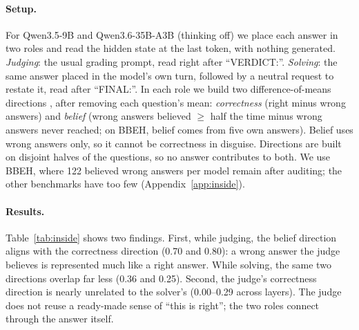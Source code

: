 \documentclass[11pt]{article}
\begin{document}
\paragraph{Setup.}
For Qwen3.5-9B and Qwen3.6-35B-A3B (thinking off) we place each answer in two roles and read the hidden state at the
last token, with nothing generated. \emph{Judging}: the usual grading prompt, read right after ``VERDICT:''.
\emph{Solving}: the same answer placed in the model's own turn, followed by a neutral request to restate it, read
after ``FINAL:''. In each role we build two difference-of-means directions \citep{marks2024geometry}, after removing
each question's mean: \emph{correctness} (right minus wrong answers) and \emph{belief} (wrong answers believed $\geq$
half the time minus wrong answers never reached; on BBEH, belief comes from five own answers). Belief uses wrong answers only, so it cannot be correctness in
disguise. Directions are built on disjoint halves of the questions, so no answer contributes to both. We use BBEH,
where 122 believed wrong answers per model remain after auditing; the other benchmarks have too few
(Appendix~\ref{app:inside}).

\begin{table}[t]
\centering
\small
{}
\caption{Cosines between directions in the hidden state (BBEH, audited labels, best layer per role; two random
directions have cosine $\approx$0.02). Belief and correctness align while judging, much less while solving; the
judge's correctness direction is unrelated to the solver's.}
\label{tab:inside}
\end{table}

\paragraph{Results.}
Table~\ref{tab:inside} shows two findings. First, while judging, the belief direction aligns with the correctness
direction (0.70 and 0.80): a wrong answer the judge believes is represented much like a right answer. While solving,
the same two directions overlap far less (0.36 and 0.25). Second, the judge's correctness direction is nearly
unrelated to the solver's (0.00--0.29 across layers). The judge does not reuse a ready-made sense of ``this is
right''; the two roles connect through the answer itself.
\end{document}
